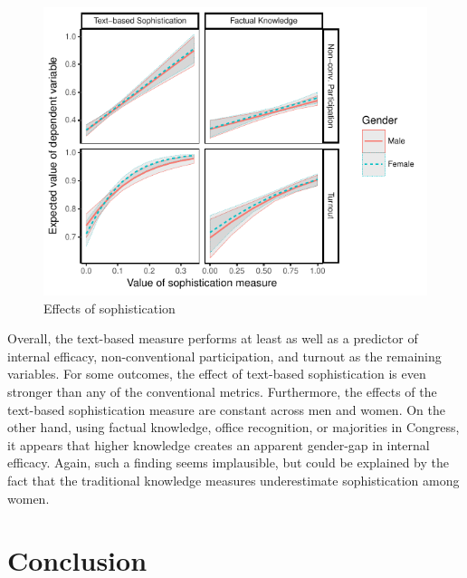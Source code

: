 \documentclass[12pt]{article}
\begin{document}
\begin{figure}[h]\centering
\includegraphics{../fig/participation.pdf}
\caption{Effects of sophistication}\label{fig:participation}
\end{figure}

Overall, the text-based measure performs at least as well as a predictor of internal efficacy, non-conventional participation, and turnout as the remaining variables. For some outcomes, the effect of text-based sophistication is even stronger than any of the conventional metrics. Furthermore, the effects of the text-based sophistication measure are constant across men and women. On the other hand, using factual knowledge, office recognition, or majorities in Congress, it appears that higher knowledge creates an apparent gender-gap in internal efficacy. Again, such a finding seems implausible, but could be explained by the fact that the traditional knowledge measures underestimate sophistication among women.

\section*{Conclusion}
\end{document}
